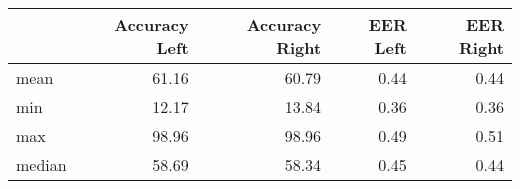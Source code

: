 \begin{tabular}{lrrrr}
\toprule
{} &  Accuracy Left &  Accuracy Right &  EER Left &  EER Right \\
\midrule
mean   &          61.16 &           60.79 &      0.44 &       0.44 \\
min    &          12.17 &           13.84 &      0.36 &       0.36 \\
max    &          98.96 &           98.96 &      0.49 &       0.51 \\
median &          58.69 &           58.34 &      0.45 &       0.44 \\
\bottomrule
\end{tabular}
